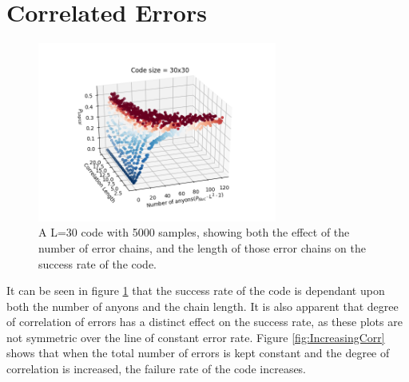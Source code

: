 \section{Correlated Errors}
\begin{figure}[htpb]
	\centering
	\includegraphics[width = 0.7\textwidth]{figs/30x30.png}
	\caption{A L=30 code with 5000 samples, showing both the effect of the number of error chains, and the length of those error chains on the success rate of the code.}
	\label{fig:3dplots}
\end{figure}
It can be seen in figure \ref{fig:3dplots} that the success rate of the code is dependant upon both the number of anyons and the chain length. It is also apparent that degree of correlation of errors has a distinct effect on the success rate, as these plots are not symmetric over the line of constant error rate. Figure \ref{fig:IncreasingCorr} shows that when the total number of errors is kept constant and the degree of correlation is increased, the failure rate of the code increases. 
